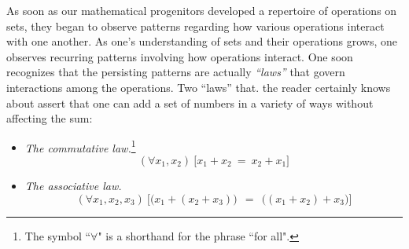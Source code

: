  
As soon as our mathematical progenitors developed a repertoire of operations on sets, they began to observe patterns regarding how various operations interact with one another.  As one's understanding of sets and their operations grows, one observes recurring patterns involving how operations interact.  One soon recognizes that the persisting patterns are actually {\em ``laws''} that govern interactions among the operations.  Two ``laws'' that. the reader certainly knows about assert that one can add a set of numbers in a variety of ways without affecting the sum:
\begin{itemize}
\item
{\it The commutative law.}\footnote{The symbol ``$\forall$" is a shorthand for the phrase ``for all".}
\[ (\forall x_1, x_2) \ \big[ x_1 + x_2 \ = \ x_2 + x_1 \big] \]

\item
{\it The associative law.}
\[ (\forall x_1, x_2, x_3) \ \big[ \big(x_1 + (x_2 + x_3)\big) \ \
= \ \ \big((x_1 + x_2) + x_3\big) \big]
\]
\end{itemize}

\bigskip

